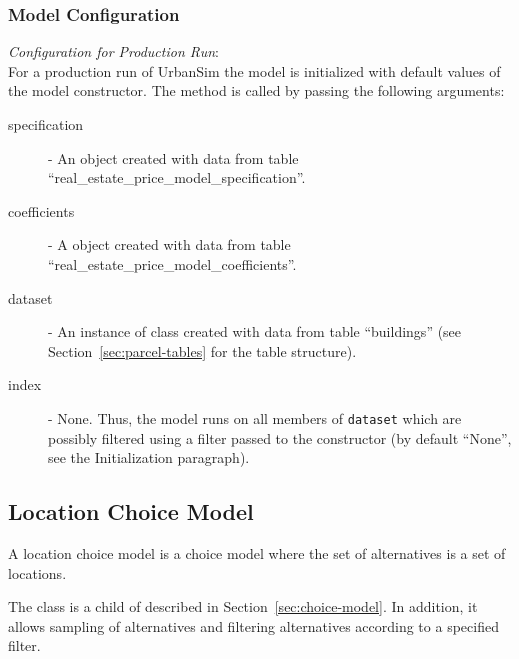 \subsubsection{Model Configuration}
\modelsindex
%
{\em Configuration for Production Run}:\\[1mm]
For a production run of UrbanSim the model is
initialized with default values of the model 
constructor. The  method is called by passing the
following arguments:
\begin{description}
\item[specification] - An
 object created with data from table
``real_estate_price_model_specification''.  
\item[coefficients] - A  object created
with data from table ``real_estate_price_model_coefficients''.\modelsindex
\item[dataset] - An instance of class  created with data
  from table ``buildings'' (see Section~\ref{sec:parcel-tables} for the
  table structure).
\item[index] - None. Thus, the model runs on all members of \verb|dataset| which are possibly 
filtered using a filter passed to the constructor (by default ``None'', see
the Initialization paragraph).
\end{description}

\subsection{Location Choice Model}
\label{sec:location-choice-model}
A location choice model is a choice model where the set of alternatives is a
set of locations.

The class  is a child of  
described in Section~\ref{sec:choice-model}. In addition, it allows sampling
of alternatives and filtering alternatives according to a specified filter.

